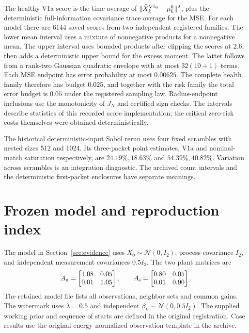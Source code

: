 The healthy V1a score is the time average of \(\|\widehat X_k^{\rm V1a}-\mu_k^0\|^2\), plus the deterministic full-information covariance trace average for the MSE. For each model there are 6144 saved scores from two independent registered families. The lower mean interval uses a mixture of nonnegative products for a nonnegative mean. The upper interval uses bounded products after clipping the scores at \(2.6\), then adds a deterministic upper bound for the excess moment. The latter follows from a rank-two Gaussian quadratic envelope with at most \(32(10+1)\) terms. Each MSE endpoint has error probability at most \(0.00625\). The complete health family therefore has budget \(0.025\), and together with the risk family the total error budget is \(0.05\) under the registered sampling law. Radius-endpoint inclusions use the monotonicity of \(J_N\) and certified sign checks. The intervals describe statistics of this recorded score implementation; the critical zero-risk costs themselves were obtained deterministically.

The historical deterministic-input Sobol rerun uses four fixed scrambles with nested sizes 512 and 1024. Its three-packet point estimates, V1a and nominal-match saturation respectively, are \(24.19\%,18.63\%\) and \(54.39\%,40.82\%\). Variation across scrambles is an integration diagnostic. The archived count intervals and the deterministic first-packet enclosures have separate meanings.

\section{Frozen model and reproduction index}
\label{app:reproduce}

The model in Section~\ref{sec:evidence} uses \(X_0\sim\mathcal N(0,I_2)\), process covariance \(I_2\), and independent measurement covariances \(0.5I_2\). The two plant matrices are
\[
 A_{\rm u}=\begin{bmatrix}1.08&0.05\\0.01&1.05\end{bmatrix},
 \qquad
 A_{\rm s}=\begin{bmatrix}0.80&0.05\\0.01&0.90\end{bmatrix}.
\]
The retained model file lists all observations, neighbor sets and common gains. The watermark uses \(\lambda=0.5\) and independent \(\beta_k\sim\mathcal N(0,0.5I_2)\). The supplied working prior and sequence of starts are defined in the original registration. Case results use the original energy-normalized observation template in the archive.

